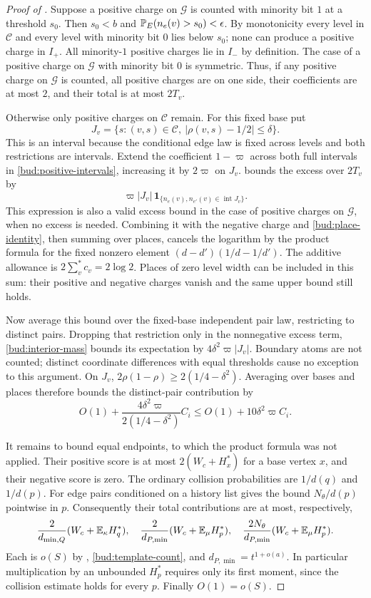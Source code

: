 \begin{proof}[Proof of ]
Suppose a positive charge on $\mathcal G$ is counted with minority bit $1$ at a
threshold $s_0$.  Then $s_0<b$ and
$\mathbb P_E(n_e(v)>s_0)<\epsilon$.  By monotonicity every level in $\mathcal C$
and every level with minority bit $0$ lies below $s_0$; none can
produce a positive charge in $I_+$.  All minority-$1$ positive
charges lie in $I_-$ by definition.  The case of a positive charge on $\mathcal G$
with minority bit $0$ is symmetric.  Thus, if any positive charge on $\mathcal G$ is
counted, all positive charges are on one side, their coefficients
are at most $2$, and their total is at most $2T_v$.

Otherwise only positive charges on $\mathcal C$ remain.  For this fixed base put
\[
 J_v=\{s:(v,s)\in\mathcal C,\ |\rho(v,s)-1/2|\le\delta\}.
\]
This is an interval because the conditional edge law is fixed
across levels and both restrictions are intervals.  Extend the
coefficient $1-\varpi$ across both full intervals in
\eqref{bud:positive-intervals}, increasing it by $2\varpi$ on
$J_v$.   bounds the excess over $2T_v$ by
\[
 \varpi|J_v|\,
 \mathbf1_{\{n_e(v),n_{e'}(v)\in\operatorname{int}J_v\}}.
\]
This expression is also a valid excess bound in the case of positive charges on $\mathcal G$, when no excess is needed.  Combining it with the negative
charge and \eqref{bud:place-identity}, then summing over places,
cancels the logarithm by the product formula for the fixed nonzero
element $(d-d')(1/d-1/d')$.  The additive allowance is
$2\sum_v^*c_v=2\log2$.  Places of zero level width can be included
in this sum: their positive and negative charges vanish and the
same upper bound still holds.

Now average this bound over the fixed-base independent pair law,
restricting to distinct pairs.  Dropping that restriction only in
the nonnegative excess term, \eqref{bud:interior-mass} bounds its
expectation by $4\delta^2\varpi|J_v|$.  Boundary atoms are not
counted; distinct coordinate differences with equal thresholds cause no exception
to this argument.  On $J_v$,
$2\rho(1-\rho)\ge2(1/4-\delta^2)$.  Averaging over bases and places
therefore bounds the distinct-pair contribution by
\[
 O(1)+\frac{4\delta^2\varpi}{2(1/4-\delta^2)}C_i
 \le O(1)+10\delta^2\varpi C_i.
\]

It remains to bound equal endpoints, to which the product formula
was not applied.  Their positive score is at most
$2(W_c+H_x^*)$ for a base vertex $x$, and their negative score is
zero.  The ordinary collision probabilities are $1/d(q)$ and
$1/d(p)$.  For edge pairs conditioned on a history list  gives the bound
$N_\theta/d(p)$ pointwise in $p$.  Consequently their total contributions
are at most, respectively,
\[
 \frac{2}{d_{\min,Q}}(W_c+\mathbb E_\kappa H_q^*),\quad
 \frac{2}{d_{P,\min}}(W_c+\mathbb E_\mu H_p^*),\quad
 \frac{2N_\theta}{d_{P,\min}}(W_c+\mathbb E_\mu H_p^*).
\]
Each is $o(S)$ by ,
\eqref{bud:template-count}, and
$d_{P,\min}=t^{1+o(a)}$.  In particular multiplication by an
unbounded $H_p^*$ requires only its first moment, since the
collision estimate holds for every $p$.  Finally $O(1)=o(S)$.
\end{proof}

